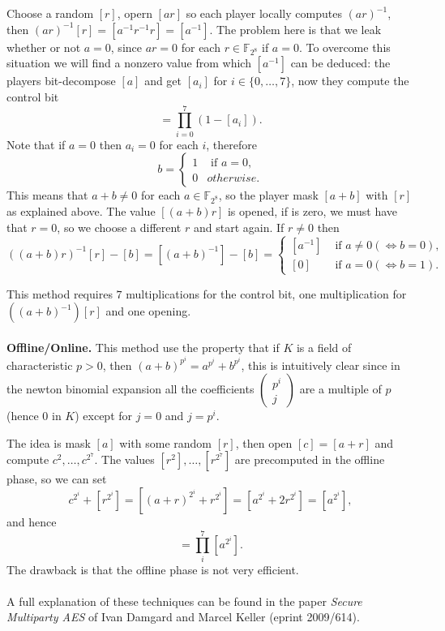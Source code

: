 \documentclass[11pt]{article}
\begin{document}
Choose a random $[r]$, opern $[ar]$ so each player locally computes $(ar)^{-1}$, then $(ar)^{-1}[r] = [a^{-1}r^{-1}r] = [a^{-1}]$. The problem here is that we leak whether or not $a=0$, since $ar=0$ for each $r \in \mathbb{F}_{2^8}$ if $a=0$. To overcome this situation we will find a nonzero value from which $[a^{-1}]$ can be deduced: the players bit-decompose $[a]$ and get $[a_i]$ for $i \in \{ 0, \ldots, 7 \}$, now they compute the control bit 
\begin{equation*}
[b] = \prod_{i=0}^7 (1-[a_i]).
\end{equation*}
Note that if $a=0$ then $a_i=0$ for each $i$, therefore
\begin{equation*}
  b=
  \begin{cases}
    1 & \text{ if } a = 0, \\
    0 & otherwise.
  \end{cases}
\end{equation*}
This means that $a + b  \neq 0$ for each $a \in \mathbb{F}_{2^8}$, so the player mask $[a + b]$ with $[r]$ as explained above. The value $[(a+b)r]$ is opened, if is zero, we must have that $r=0$, so we choose a different $r$ and start again. If $r \neq 0$ then 
\begin{equation*}
  ((a+b)r)^{-1}[r] - [b] = [(a+b)^{-1}] -[b] =
  \begin{cases}
    [a^{-1}] & \text{ if } a \neq 0 (\Leftrightarrow b=0), \\
    [0] & \text{ if } a=0 ( \Leftrightarrow b = 1).
  \end{cases}
\end{equation*}

This method requires $7$ multiplications for the control bit, one multiplication for $((a+b)^{-1})[r]$ and one opening.
\\ \\
\textbf{Offline/Online.} This method use the property that if $K$ is a field of characteristic $p > 0$, then $(a+b)^{p^i} = a^{p^i} + b^{p^i}$, this is intuitively clear since in the newton binomial expansion all the coefficients $(\begin{array}{c}p^i \\ j \end{array})$ are a multiple of $p$ (hence $0$ in $K$) except for $j = 0$ and $j = p^i$.

The idea is mask $[a]$ with some random $[r]$, then open $[c] = [a+r]$ and compute $c^2, \ldots, c^{2^7}$. The values $[r^2], \ldots ,[r^{2^7}]$ are precomputed in the offline phase, so we can set
\begin{equation*} 
c^{2^i} + [r^{2^i}] = [ (a+r)^{2^i} + r^{2^i}] = [a^{2^i} +2r^{2^i}] = [a^{2^i}],
\end{equation*}
and hence
\begin{equation*}
  [a^{254}]= \prod_i^7 [a^{2^i}].
\end{equation*}
The drawback is that the offline phase is not very efficient.
\\ \\
A full explanation of these techniques can be found in the paper \emph{Secure Multiparty AES} of Ivan Damgard and Marcel Keller (eprint 2009/614).



\end{document}
